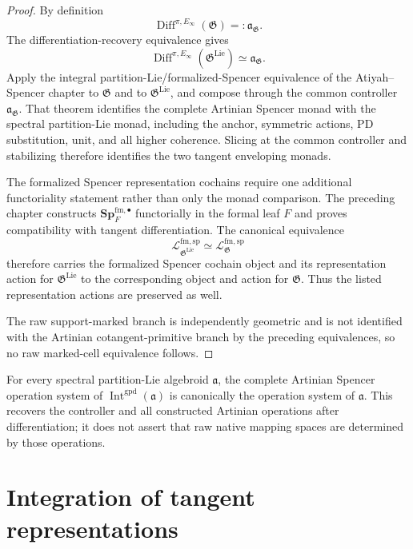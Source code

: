 \begin{proof}
By definition
\[
    \operatorname{Diff}^{\pi,E_\infty}(\mathfrak G)
    =:\mathfrak a_{\mathfrak G}.
\]
The differentiation-recovery equivalence gives
\[
    \operatorname{Diff}^{\pi,E_\infty}
    (\mathfrak G^{\mathrm{Lie}})
    \simeq
    \mathfrak a_{\mathfrak G}.
\]
Apply the integral partition-Lie/formalized-Spencer equivalence of the
Atiyah--Spencer chapter to $\mathfrak G$ and to
$\mathfrak G^{\mathrm{Lie}}$, and compose through the common controller
$\mathfrak a_{\mathfrak G}$.  That theorem identifies the complete Artinian
Spencer monad with the spectral partition-Lie monad, including the anchor,
symmetric actions, PD substitution, unit, and all higher coherence.  Slicing
at the common controller and stabilizing therefore identifies the two tangent
enveloping monads.

The formalized Spencer representation cochains require one additional
functoriality statement rather than only the monad comparison.  The preceding
chapter constructs
$\mathbf{Sp}^{\mathrm{fm},\bullet}_F$ functorially in the formal leaf $F$ and
proves compatibility with tangent differentiation.  The canonical equivalence
\[
    \mathcal L^{\mathrm{fm,sp}}_{\mathfrak G^{\mathrm{Lie}}}
    \simeq
    \mathcal L^{\mathrm{fm,sp}}_{\mathfrak G}
\]
therefore carries the formalized Spencer cochain object and its representation
action for $\mathfrak G^{\mathrm{Lie}}$ to the corresponding object and action
for $\mathfrak G$.  Thus the listed representation actions are preserved as
well.

The raw support-marked branch is independently geometric and is not identified
with the Artinian cotangent-primitive branch by the preceding equivalences, so
no raw marked-cell equivalence follows.
\end{proof}

\begin{corollary}
\label{cor:bnli-universal-operation-property}
For every spectral partition-Lie algebroid $\mathfrak a$, the complete Artinian
Spencer operation system of
$\operatorname{Int}^{\mathrm{gpd}}(\mathfrak a)$ is canonically the operation
system of $\mathfrak a$.  This recovers the controller and all constructed
Artinian operations after differentiation; it does not assert that raw native
mapping spaces are determined by those operations.
\end{corollary}

\section{Integration of tangent representations}
\label{sec:bnli-representations}

